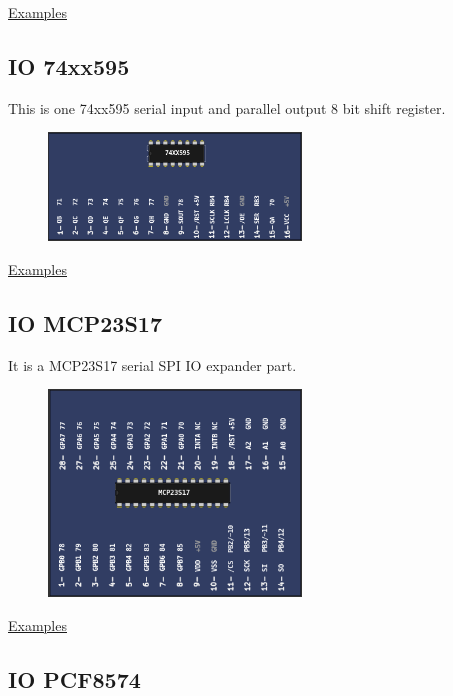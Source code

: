 \href{https://lcgamboa.github.io/picsimlab_examples/Parts.html\#ETH_w5500}{Examples}
 

\subsection{IO 74xx595}

This is one 74xx595 serial input and parallel output 8 bit shift register.

\begin{figure}[H]
\center
\includegraphics[width=0.6\textwidth]{img/part_74xx595.png} 
\end{figure} 

\href{https://lcgamboa.github.io/picsimlab_examples/Parts.html\#IO_74xx595}{Examples}

\subsection{IO MCP23S17}

It is a MCP23S17 serial SPI IO expander part.

\begin{figure}[H]
\center
\includegraphics[width=0.6\textwidth]{img/part_MCP23S17.png} 
\end{figure} 

\href{https://lcgamboa.github.io/picsimlab_examples/Parts.html\#IO_MCP23S17}{Examples}

\subsection{IO PCF8574}


